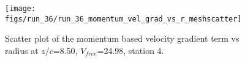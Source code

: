 \begin{figure}[H]
\centering
\texttt{[image: figs/run\_36/run\_36\_momentum\_vel\_grad\_vs\_r\_meshscatter]}
\caption{Scatter plot of the momentum based velocity gradient term vs radius at $z/c$=8.50, $V_{free}$=24.98, station 4.}
\label{fig:run_36_momentum_vel_grad_vs_r_meshscatter}
\end{figure}


